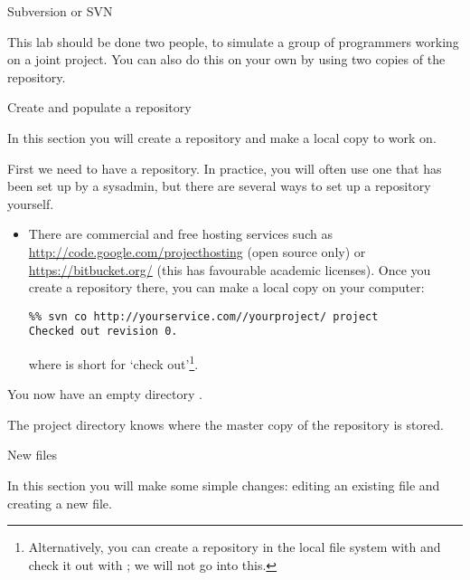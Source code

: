  {Subversion or SVN}

This lab should be done two people, to simulate a group of programmers
working on a joint project. You can also do this on your own by using
two copies of the repository.

 {Create and populate a repository}

\begin{purpose}
  In this section you will create a repository and make a local copy
  to work on.
\end{purpose}

First we need to have a repository. In practice, you will often use
one that has been set up by a sysadmin, but there are several ways to
set up a repository yourself.
\begin{itemize}
\item There are commercial and free hosting services such as 
  \url{http://code.google.com/projecthosting} (open source only) or
   \url{https://bitbucket.org/}
  (this has favourable academic licenses). Once you create a
  repository there, you can make a local copy on your computer:
\begin{verbatim}
%% svn co http://yourservice.com//yourproject/ project
Checked out revision 0.
\end{verbatim}
where  is short for `check out'\footnote{Alternatively, you can create a repository in the local file system with  and check it out with ; we will not go into this.}.
\end{itemize}
You now have an empty directory .


The project directory knows where the master copy of the repository is
stored.



 {New files}

\begin{purpose}
  In this section you will make some simple changes: editing an
  existing file and creating a new file.
\end{purpose}

